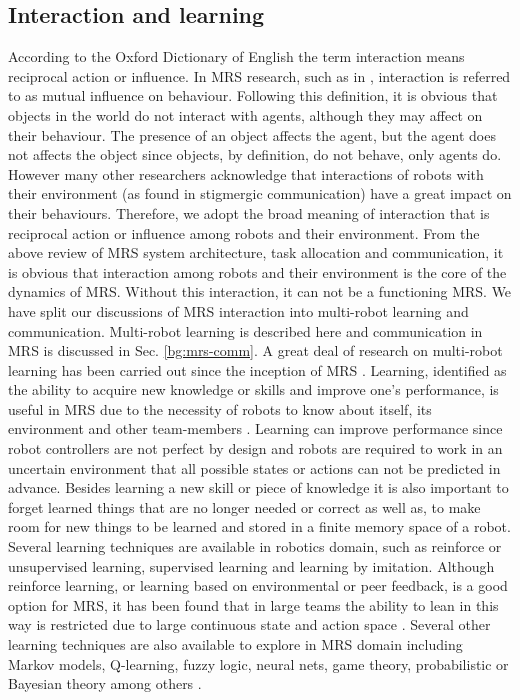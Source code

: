 \subsection*{Interaction and learning}
\label{bg:mrs:learn}
According to the Oxford Dictionary of English the term interaction means reciprocal action or influence. In MRS research, such as in \cite{Mataric1994}, interaction is referred to as mutual influence on behaviour. Following this definition, it is obvious that objects in the world do not interact with agents, although they may affect on their behaviour. The presence of an object affects the agent, but the agent does not affects the object since objects, by definition, do not behave, only agents do. However many other researchers acknowledge that interactions of robots with their environment (as found in stigmergic communication) have a great impact on their behaviours. Therefore, we adopt the broad meaning of interaction that is reciprocal action or influence among robots and their environment. From the above review of MRS system architecture, task allocation and communication, it is obvious that interaction among robots and their environment is the core of the dynamics of MRS. Without this interaction, it can not be a functioning MRS. We have split our discussions of MRS interaction into multi-robot learning and communication. Multi-robot learning is described here and communication in MRS is discussed in Sec. \ref{bg:mrs-comm}.
A great deal of research on multi-robot learning has been carried out since the inception of MRS \cite{Mataric+2001,Yang+2004,Parker1995}. Learning, identified as the ability to acquire new knowledge or skills and improve one's performance, is useful in MRS due to the necessity of robots to know about itself, its environment and other team-members \cite{Mataric2007}. Learning can improve performance since robot controllers are not perfect by design and robots are required to work in an uncertain environment that all possible states or actions can not be predicted in advance. Besides learning a new skill or piece of knowledge it is also important to forget learned things that are no longer needed or correct as well as, to make room for new things to be learned and stored in a finite memory space of a robot. \\
Several learning techniques are available in robotics domain, such as reinforce or unsupervised learning, supervised learning and learning by imitation. Although reinforce learning, or learning based on environmental or peer feedback, is a good option for MRS, it has been found that in large teams the ability to lean in this way is restricted due to large continuous state and action space \cite{Yang+2004}. Several other learning techniques are also available to explore in MRS domain including Markov models, Q-learning, fuzzy logic, neural nets, game theory, probabilistic or Bayesian theory among others \cite{Mataric2007}. 
